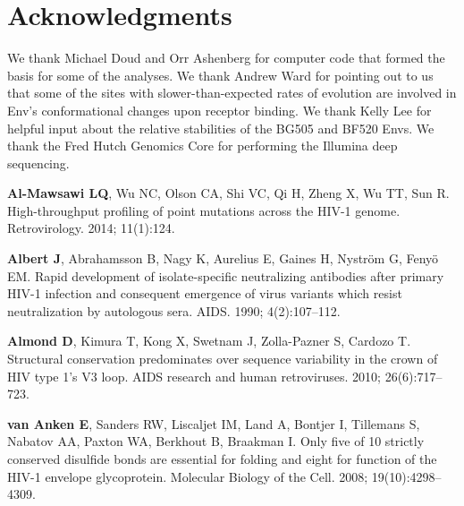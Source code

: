 \documentclass[9pt]{elife}
\begin{document}
\section{Acknowledgments}
We thank Michael Doud and Orr Ashenberg for computer code that formed the basis for some of the analyses.
We thank Andrew Ward for pointing out to us that some of the sites with slower-than-expected rates of evolution are involved in Env's conformational changes upon receptor binding.
We thank Kelly Lee for helpful input about the relative stabilities of the BG505 and BF520 Envs.
We thank the Fred Hutch Genomics Core for performing the Illumina deep sequencing.

\begin{thebibliography}{114}
\providecommand{\natexlab}[1]{#1}
\providecommand{\urlprefix}{}
\providecommand{\doiprefix}{doi: }

\textbf{\color{eLifeMediumGrey} Al-Mawsawi LQ}, Wu NC, Olson CA, Shi VC, Qi H,
  Zheng X, Wu TT, Sun R.
\newblock High-throughput profiling of point mutations across the HIV-1 genome.
\newblock Retrovirology.  2014; 11(1):124.

\textbf{\color{eLifeMediumGrey} Albert J}, Abrahamsson B, Nagy K, Aurelius E,
  Gaines H, Nystr{\"o}m G, Feny{\"o} EM.
\newblock Rapid development of isolate-specific neutralizing antibodies after
  primary HIV-1 infection and consequent emergence of virus variants which
  resist neutralization by autologous sera.
\newblock AIDS.  1990; 4(2):107--112.

\textbf{\color{eLifeMediumGrey} Almond D}, Kimura T, Kong X, Swetnam J,
  Zolla-Pazner S, Cardozo T.
\newblock Structural conservation predominates over sequence variability in the
  crown of {HIV} type 1's {V3} loop.
\newblock AIDS research and human retroviruses.  2010; 26(6):717--723.

\textbf{\color{eLifeMediumGrey} van Anken E}, Sanders RW, Liscaljet IM, Land A,
  Bontjer I, Tillemans S, Nabatov AA, Paxton WA, Berkhout B, Braakman I.
\newblock Only five of 10 strictly conserved disulfide bonds are essential for
  folding and eight for function of the HIV-1 envelope glycoprotein.
\newblock Molecular Biology of the Cell.  2008; 19(10):4298--4309.


\end{thebibliography}
\end{document}
